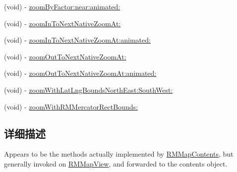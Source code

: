 \begin{DoxyCompactItemize}
\item 
(void) -\/ \hyperlink{protocol_r_m_map_contents_facade-p_adbcb106790b92819764375c1f0deb77b}{zoom\-By\-Factor\-:near\-:animated\-:}
\item 
(void) -\/ \hyperlink{protocol_r_m_map_contents_facade-p_ae428e14027ddbb7e01fbd76e12b9563b}{zoom\-In\-To\-Next\-Native\-Zoom\-At\-:}
\item 
(void) -\/ \hyperlink{protocol_r_m_map_contents_facade-p_a6789cd20384edead12a12c756b79d31a}{zoom\-In\-To\-Next\-Native\-Zoom\-At\-:animated\-:}
\item 
(void) -\/ \hyperlink{protocol_r_m_map_contents_facade-p_a789f690bbc442baec16cf38d1341cc49}{zoom\-Out\-To\-Next\-Native\-Zoom\-At\-:}
\item 
(void) -\/ \hyperlink{protocol_r_m_map_contents_facade-p_adb9ae6c8f8b4c4e8168adb0ddac9a768}{zoom\-Out\-To\-Next\-Native\-Zoom\-At\-:animated\-:}
\item 
(void) -\/ \hyperlink{protocol_r_m_map_contents_facade-p_a95002f376d4c057ed69c39a33d738698}{zoom\-With\-Lat\-Lng\-Bounds\-North\-East\-:\-South\-West\-:}
\item 
(void) -\/ \hyperlink{protocol_r_m_map_contents_facade-p_adac46282107bc99c884bcc1365845059}{zoom\-With\-R\-M\-Mercator\-Rect\-Bounds\-:}
\end{DoxyCompactItemize}


\subsection{详细描述}
Appears to be the methods actually implemented by \hyperlink{interface_r_m_map_contents}{R\-M\-Map\-Contents}, but generally invoked on \hyperlink{interface_r_m_map_view}{R\-M\-Map\-View}, and forwarded to the contents object. 

